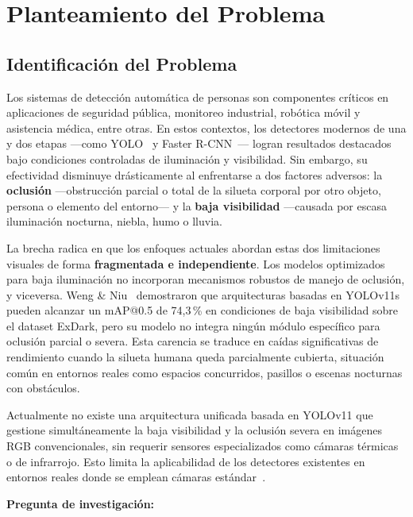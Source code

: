 \section{Planteamiento del Problema}

\subsection{Identificaci\'on del Problema}

Los sistemas de detecci\'on autom\'atica de personas son componentes
cr\'{i}ticos en aplicaciones de seguridad p\'{u}blica, monitoreo
industrial, rob\'otica m\'ovil y asistencia m\'edica, entre otras.
En estos contextos, los detectores modernos de una y dos etapas
---como YOLO~\cite{Redmon2016} y Faster R-CNN~\cite{Ren2015}---
logran resultados destacados bajo condiciones controladas de
iluminaci\'on y visibilidad. Sin embargo, su efectividad disminuye
dr\'asticamente al enfrentarse a dos factores adversos: la
\textbf{oclusi\'on} ---obstrucci\'on parcial o total de la silueta
corporal por otro objeto, persona o elemento del entorno--- y la
\textbf{baja visibilidad} ---causada por escasa iluminaci\'on
nocturna, niebla, humo o lluvia.

La brecha radica en que los enfoques actuales abordan estas dos
limitaciones visuales de forma \textbf{fragmentada e independiente}.
Los modelos optimizados para baja iluminaci\'on no incorporan
mecanismos robustos de manejo de oclusi\'on, y viceversa. Weng \&
Niu~\cite{ElsYolo2025} demostraron que arquitecturas basadas en
YOLOv11s pueden alcanzar un mAP@0.5 de 74{,}3\,\% en condiciones
de baja visibilidad sobre el dataset ExDark, pero su modelo no
integra ning\'un m\'odulo espec\'{i}fico para oclusi\'on parcial o
severa. Esta carencia se traduce en ca\'{i}das significativas de
rendimiento cuando la silueta humana queda parcialmente cubierta,
situaci\'on com\'un en entornos reales como espacios concurridos,
pasillos o escenas nocturnas con obst\'aculos.

Actualmente no existe una arquitectura unificada basada en
YOLOv11 que gestione simult\'aneamente la baja visibilidad y la
oclusi\'on severa en im\'agenes RGB convencionales, sin requerir
sensores especializados como c\'amaras t\'ermicas o de infrarrojo.
Esto limita la aplicabilidad de los detectores existentes en
entornos reales donde se emplean c\'amaras est\'andar~\cite{Deng2024,
Tang2026, He2025}.

\bigskip
\noindent\textbf{Pregunta de investigaci\'on:}

